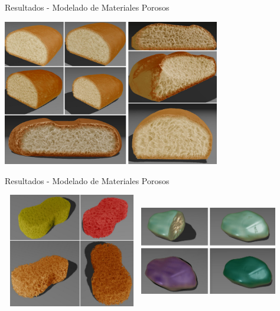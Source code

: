 \documentclass[spanish,unknownkeysallowed,10pt]{beamer}
\begin{document}
\begin{frame}{Resultados - Modelado de Materiales Porosos}


\centerline{\includegraphics[width=9.5cm]{../figures/Fig12CAVW}}
\end{frame}

\begin{frame}{Resultados - Modelado de Materiales Porosos}

\includegraphics[width=6cm, height=5cm]{../figures/Fig13CAVW}
\includegraphics[width=6cm, height=5cm]{../figures/Fig14CAVW}

\end{frame}
\end{document}
